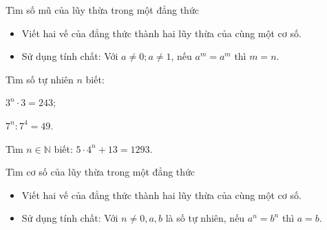 \begin{dang}{Tìm số mũ của lũy thừa trong một đẳng thức}
	\begin{itemize}
		\item Viết hai vế của đẳng thức thành hai lũy thừa của cùng một cơ số.
		\item Sử dụng tính chất: Với $a \neq 0; a\neq 1$, nếu $a^m = a^m$ thì $m = n$.
	\end{itemize}
\end{dang}
\begin{vd}%
Tìm số tự nhiên $n$ biết:
\begin{enumEX}{2}
	\item $3^n\cdot 3 = 243$;
	\item $7^n : 7^4 = 49$.
\end{enumEX}
\end{vd}
\begin{vd}%
	Tìm $n \in \mathbb{N}$ biết: $ 5\cdot 4^n + 13 = 1293$.
\end{vd}
\begin{dang}{Tìm cơ số của lũy thừa trong một đẳng thức}
	\begin{itemize}
		\item Viết hai vế của đẳng thức thành hai lũy thừa của cùng một cơ số.
		\item Sử dụng tính chất: Với $n \neq 0, a, b$ là số tự nhiên, nếu $a^n = b^n$ thì $a = b$.
	\end{itemize}
\end{dang}

